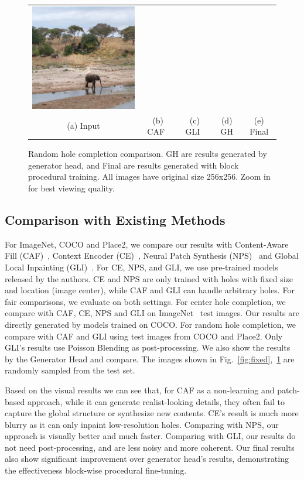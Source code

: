 \begin{figure}[h!]
\begin{tabular}{ccccc}
\includegraphics[width=.2\textwidth]{figures/random/000000286994.jpg}\\
(a) Input & (b) CAF~\cite{barnes2009patchmatch} & (c) GLI~\cite{iizuka2017globally} & (d) GH & (e) Final \\
\end{tabular}
\caption{Random hole completion comparison. GH are results generated by generator head, and Final are results generated with block procedural training. All images have original size 256x256. Zoom in for best viewing quality.}
\label{fig:random}
\vspace{-10pt}
\end{figure}

\subsection{Comparison with Existing Methods}
\label{exp:comparison}
For ImageNet, COCO and Place2, we compare our results with Content-Aware Fill (CAF)~\cite{barnes2009patchmatch}, Context Encoder (CE)~\cite{pathak2016context}, Neural Patch Synthesis (NPS)~\cite{yang2017high} and Global Local Inpainting (GLI)~\cite{iizuka2017globally}. For CE, NPS, and GLI, we use pre-trained models released by the authors. CE and NPS are only trained with holes with fixed size and location (image center), while CAF and GLI can handle arbitrary holes. For fair comparisons, we evaluate on both settings. For center hole completion, we compare with CAF, CE, NPS and GLI on ImageNet~\cite{russakovsky2015imagenet} test images. Our results are directly generated by models trained on COCO. For random hole completion, we compare with CAF and GLI using test images from COCO and Place2. Only GLI's results use Poisson Blending as post-processing. We also show the results by the Generator Head and compare. The images shown in Fig.~\ref{fig:fixed},~\ref{fig:random} are randomly sampled from the test set. 

Based on the visual results we can see that, for CAF as a non-learning and patch-based approach, while it can generate realist-looking details, they often fail to capture the global structure or synthesize new contents. CE's result is much more blurry as it can only inpaint low-resolution holes. Comparing with NPS, our approach is visually better and much faster. Comparing with GLI, our results do not need post-processing, and are less noisy and more coherent. Our final results also show significant improvement over generator head's results, demonstrating the effectiveness block-wise procedural fine-tuning.

